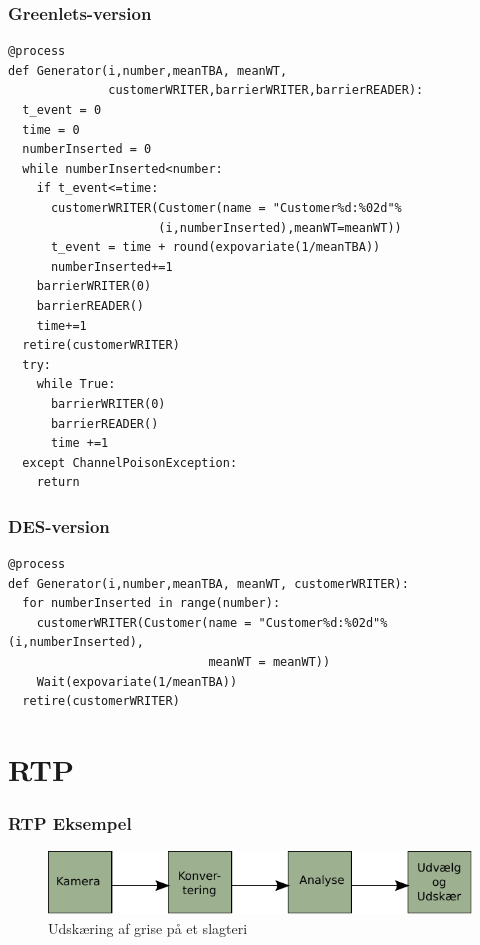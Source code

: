 \documentclass[12pt]{beamer}
\begin{document}
\begin{frame}[fragile]
  \frametitle{Greenlets-version}
\begin{lstlisting}
@process
def Generator(i,number,meanTBA, meanWT,
              customerWRITER,barrierWRITER,barrierREADER):
  t_event = 0
  time = 0
  numberInserted = 0
  while numberInserted<number:
    if t_event<=time:
      customerWRITER(Customer(name = "Customer%d:%02d"%
                     (i,numberInserted),meanWT=meanWT))
      t_event = time + round(expovariate(1/meanTBA))
      numberInserted+=1
    barrierWRITER(0)
    barrierREADER()
    time+=1
  retire(customerWRITER)
  try:
    while True:
      barrierWRITER(0)
      barrierREADER()
      time +=1
  except ChannelPoisonException: 
    return
\end{lstlisting}
\end{frame}

\begin{frame}[fragile]
  \frametitle{DES-version}
\begin{lstlisting}
@process
def Generator(i,number,meanTBA, meanWT, customerWRITER):
  for numberInserted in range(number):
    customerWRITER(Customer(name = "Customer%d:%02d"%(i,numberInserted),
                            meanWT = meanWT))
    Wait(expovariate(1/meanTBA))
  retire(customerWRITER)
\end{lstlisting}
\end{frame}

\section{RTP}

\begin{frame}
  \frametitle{RTP Eksempel}
  \begin{figure}
 \begin{center}
  \includegraphics[scale=0.75]{pig-network}
	\caption{Udskæring af grise på et slagteri}
	\label{fig:hard-rtp}
\end{center}
\end{figure}

\end{frame}
\end{document}
